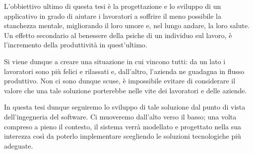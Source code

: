\vspace{10mm}
\noindent L'obbiettivo ultimo di questa tesi è la progettazione e lo sviluppo di un applicativo in grado di aiutare i lavoratori a soffrire il meno possibile la stanchezza mentale, migliorando il loro umore e, nel lungo andare, la loro salute.\newline
Un effetto secondario al benessere della psiche di un individuo sul lavoro, è l'incremento della produttività in quest'ultimo.\newline

\noindent Si viene dunque a creare una situazione in cui vincono tutti: da un lato i lavoratori sono più felici e rilassati e, dall'altro, l'azienda ne guadagna in flusso produttivo.\newline
Non ci sono dunque scuse, è impossibile evitare di considerare il valore che una tale soluzione porterebbe nelle vite dei lavoratori e delle aziende.\newline

\noindent In questa tesi dunque seguiremo lo sviluppo di tale soluzione dal punto di vista dell'ingegneria del software.\newline
Ci muoveremo dall'alto verso il basso; una volta compreso a pieno il contesto, il sistema verrà modellato e progettato nella sua interezza così da poterlo implementare scegliendo le soluzioni tecnologiche più adeguate.
